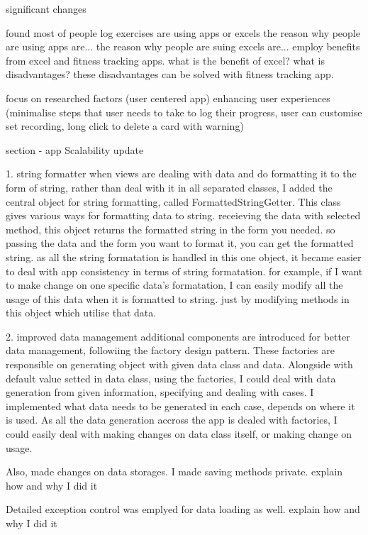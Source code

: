 
significant changes 

found most of people log exercises are using apps or excels
the reason why people are using apps are...
the reason why people are suing excels are...
employ benefits from excel and fitness tracking apps.
what is the benefit of excel?
what is disadvantages?
these disadvantages can be solved with fitness tracking app. 


focus on researched factors (user centered app)
enhancing user experiences
(minimalise steps that user needs to take to log their progress, user can customise set recording, long click to delete a card with warning)




section - app  Scalability  update 

1. string formatter 
when views are dealing with data and do formatting it to the form of string,
rather than deal with it in all separated classes,
I added the central object for string formatting, called FormattedStringGetter.
This class gives various ways for formatting data to string. 
receieving the data with selected method, this object returns the formatted string in the form you needed.
so passing the data and the form you want to format it, you can get the formatted string.
as all the string formatation is handled in this one object,
it became easier to deal with app consistency in terms of string formatation.
for example, if I want to make change on one specific data's formatation,
I can easily modify all the usage of this data when it is formatted to string.
just by modifying methods in this object which utilise that data. 

2. improved data management
additional components are introduced for better data management, followiing the factory design pattern.
These factories are responsible on generating object with given data class and data.
Alongside with default value setted in data class,
using the factories, I could deal with data generation from given information, specifying and dealing with cases.
I implemented what data needs to be generated in each case, 
depends on where it is used.
As all the data generation accross the app is dealed with factories,
I could easily deal with making changes on data class itself, or making change on usage.

Also, made changes on data storages.
I made saving methods private.
explain how and why I did it 

Detailed exception control was emplyed for data loading as well.
 explain how and why I did it 



